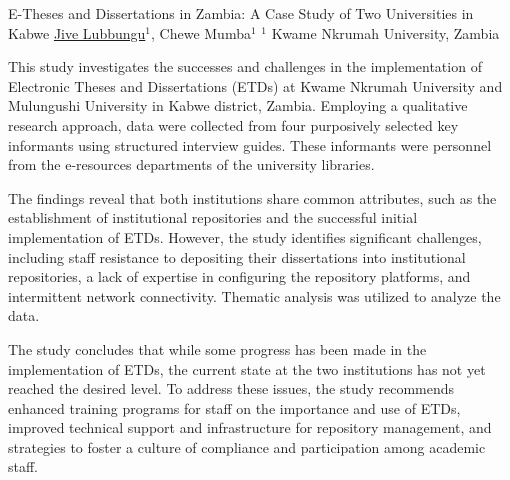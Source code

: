 

   \begin{abstract_online}{E-Theses and Dissertations in Zambia: A Case Study of Two Universities in Kabwe}{%
    \underline{Jive Lubbungu}$^{1}$, Chewe Mumba$^{1}${%
    }{%
    $^1$ Kwame Nkrumah University, Zambia}
}

This study investigates the successes and challenges in the implementation of Electronic Theses and Dissertations (ETDs) at Kwame Nkrumah University and Mulungushi University in Kabwe district, Zambia. Employing a qualitative research approach, data were collected from four purposively selected key informants using structured interview guides. These informants were personnel from the e-resources departments of the university libraries. 

The findings reveal that both institutions share common attributes, such as the establishment of institutional repositories and the successful initial implementation of ETDs. However, the study identifies significant challenges, including staff resistance to depositing their dissertations into institutional repositories, a lack of expertise in configuring the repository platforms, and intermittent network connectivity. Thematic analysis was utilized to analyze the data.

The study concludes that while some progress has been made in the implementation of ETDs, the current state at the two institutions has not yet reached the desired level. To address these issues, the study recommends enhanced training programs for staff on the importance and use of ETDs, improved technical support and infrastructure for repository management, and strategies to foster a culture of compliance and participation among academic staff.

\end{abstract_online}

